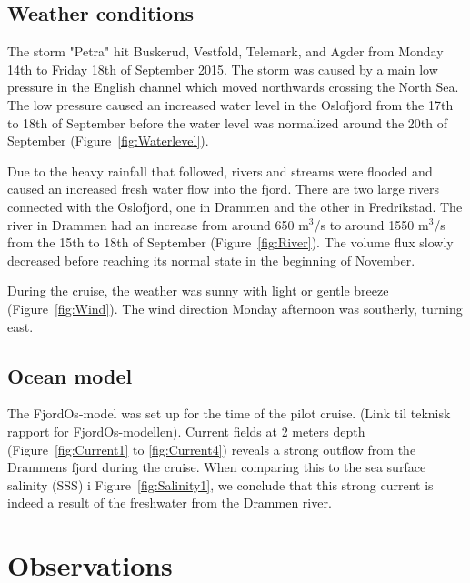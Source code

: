 \documentclass[12pt,a4paper,english]{article}
\begin{document}
\subsection{Weather conditions}

The storm "Petra" hit Buskerud, Vestfold, Telemark, and Agder from Monday 14th to Friday 18th of September 2015. The storm was caused by a main low pressure in the English channel which moved northwards crossing the North Sea. The low pressure caused an increased water level in the Oslofjord from the 17th to 18th of September before the water level was normalized around the 20th of September (Figure~\ref{fig:Waterlevel}).

Due to the heavy rainfall that followed, rivers and streams were flooded and caused an increased fresh water flow into the fjord. There are two large rivers connected with the Oslofjord, one in Drammen and the other in Fredrikstad. The river in Drammen had an increase from around 650 m$^3$/s to around 1550 m$^3$/s from the 15th to 18th of September (Figure~\ref{fig:River}). The volume flux slowly decreased before reaching its normal state in the beginning of November. 

During the cruise, the weather was sunny with light or gentle breeze (Figure~\ref{fig:Wind}). The wind direction Monday afternoon was southerly, turning east. 

\subsection{Ocean model}
The FjordOs-model was set up for the time of the pilot cruise. (Link til teknisk rapport for FjordOs-modellen). Current fields at 2 meters depth (Figure~\ref{fig:Current1} to \ref{fig:Current4}) reveals a strong outflow from the Drammens fjord during the cruise. When comparing this to the sea surface salinity (SSS) i Figure~\ref{fig:Salinity1}, we conclude that this strong current is indeed a result of the freshwater from the Drammen river.



\clearpage

\section{Observations}
\end{document}
